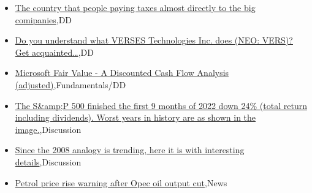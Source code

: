 \documentclass{article}%
\begin{document}
%
\begin{itemize}%
\item%
\href{https://reddit.com/r/wallstreetbets/comments/xx4a95/the\_country\_that\_people\_paying\_taxes\_almost/}{The country that people paying taxes almost directly to the big comipanies},DD%
\item%
\href{https://reddit.com/r/Baystreetbets/comments/xwjr27/do\_you\_understand\_what\_verses\_technologies\_inc/}{Do you understand what VERSES Technologies Inc. does (NEO: VERS)? Get acquainted\ldots},DD%
\item%
\href{https://reddit.com/r/StockMarket/comments/xx1z98/microsoft\_fair\_value\_a\_discounted\_cash\_flow/}{Microsoft Fair Value - A Discounted Cash Flow Analysis (adjusted)},Fundamentals/DD%
\item%
\href{https://reddit.com/r/StockMarket/comments/xwquhx/the\_sp\_500\_finished\_the\_first\_9\_months\_of\_2022/}{The S\&amp;P 500 finished the first 9 months of 2022 down 24\% (total return including dividends). Worst years in history are as shown in the image.},Discussion%
\item%
\href{https://reddit.com/r/StockMarket/comments/xwqbf0/since\_the\_2008\_analogy\_is\_trending\_here\_it\_is/}{Since the 2008 analogy is trending, here it is with interesting details},Discussion%
\item%
\href{https://reddit.com/r/Economics/comments/xwzd9x/petrol\_price\_rise\_warning\_after\_opec\_oil\_output/}{Petrol price rise warning after Opec oil output cut},News%
\end{itemize}%
\end{document}
